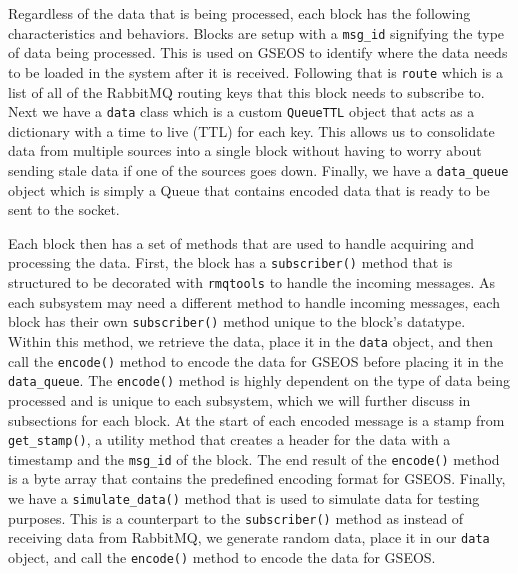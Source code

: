 Regardless of the data that is being processed, each block has the following characteristics and behaviors. 
Blocks are setup with a \texttt{msg\_id} signifying the type of data being processed. 
This is used on GSEOS to identify where the data needs to be loaded in the system after it is received.
Following that is \texttt{route} which is a list of all of the RabbitMQ routing keys that this block needs to subscribe to.
Next we have a \texttt{data} class which is a custom \texttt{QueueTTL} object that acts as a dictionary with a time to live (TTL) for each key.
This allows us to consolidate data from multiple sources into a single block without having to worry about sending stale data if one of the sources goes down.
Finally, we have a \texttt{data\_queue} object which is simply a Queue that contains encoded data that is ready to be sent to the socket.

Each block then has a set of methods that are used to handle acquiring and processing the data.
First, the block has a \texttt{subscriber()} method that is structured to be decorated with \texttt{rmqtools} to handle the incoming messages.
As each subsystem may need a different method to handle incoming messages, each block has their own \texttt{subscriber()} method unique to the block's datatype.
Within this method, we retrieve the data, place it in the \texttt{data} object, and then call the \texttt{encode()} method to encode the data for GSEOS before placing it in the \texttt{data\_queue}.
The \texttt{encode()} method is highly dependent on the type of data being processed and is unique to each subsystem, which we will further discuss in subsections for each block. 
At the start of each encoded message is a stamp from \texttt{get\_stamp()}, a utility method that creates a header for the data with a timestamp and the \texttt{msg\_id} of the block.
The end result of the \texttt{encode()} method is a byte array that contains the predefined encoding format for GSEOS.
Finally, we have a \texttt{simulate\_data()} method that is used to simulate data for testing purposes.
This is a counterpart to the \texttt{subscriber()} method as instead of receiving data from RabbitMQ, we generate random data, place it in our \texttt{data} object, and call the \texttt{encode()} method to encode the data for GSEOS.

